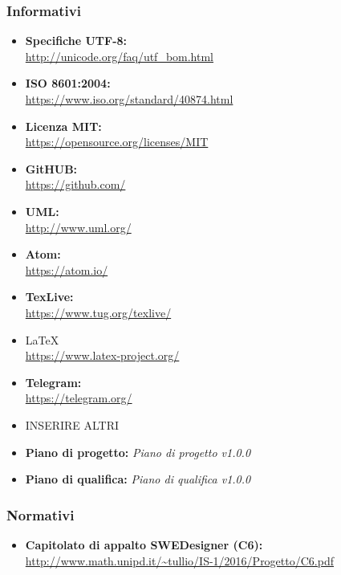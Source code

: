    \subsubsection{Informativi}
      \begin{itemize}
        \item \textbf{Specifiche UTF-8:}\\
        \url{http://unicode.org/faq/utf_bom.html}
        \item \textbf{ISO 8601:2004:} \\
        \url{https://www.iso.org/standard/40874.html}\\
        \item \textbf{Licenza MIT:}\\
        \url{https://opensource.org/licenses/MIT}\\
        \item \textbf{GitHUB:}\\
        \url{https://github.com/}
        \item \textbf{UML:} \\
        \url{http://www.uml.org/}
        \item \textbf{Atom:}\\
        \url{https://atom.io/}
        \item \textbf{TexLive:}\\
        \url{https://www.tug.org/texlive/}
        \item \LaTeX\\
        \url{https://www.latex-project.org/}
        \item \textbf{Telegram:}\\
        \url{https://telegram.org/}
        \item INSERIRE ALTRI
        \item \textbf{Piano di progetto:} \emph{Piano di progetto v1.0.0}
        \item \textbf{Piano di qualifica:} \emph{Piano di qualifica v1.0.0}
      \end{itemize}
    \subsubsection{Normativi}
      \begin{itemize}
        \item \textbf{Capitolato di appalto SWEDesigner (C6):}\\
        \url{http://www.math.unipd.it/~tullio/IS-1/2016/Progetto/C6.pdf}
      \end{itemize}
